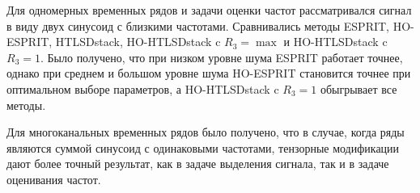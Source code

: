 \documentclass[12pt]{article}
\theoremstyle{definition}
\theoremstyle{remark}
\begin{document}
Для одномерных временных рядов и задачи оценки частот рассматривался сигнал в виду двух синусоид с близкими частотами. Сравнивались методы ESPRIT, HO-ESPRIT, HTLSDstack, HO-HTLSDstack c $R_3=\max$ и HO-HTLSDstack c $R_3=1$. Было получено, что при низком уровне шума ESPRIT работает точнее, однако при среднем и большом уровне шума HO-ESPRIT становится точнее при оптимальном выборе параметров, а HO-HTLSDstack c $R_3=1$ обыгрывает все методы.

Для многоканальных временных рядов было получено, что в случае, когда ряды являются суммой синусоид с одинаковыми частотами, тензорные модификации дают  более точный результат, как в задаче выделения сигнала, так и в задаче оценивания частот.
\end{document}
